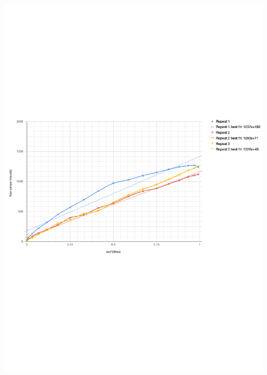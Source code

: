 \documentclass{article}
\begin{document}
\includegraphics[keepaspectratio=true,width=\dimmin{}{\dimwidth{0.90}}]{images/Screenshot-2019-01-23-at-19.28.08}{}%
\end{document}
